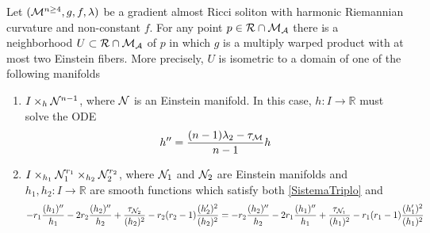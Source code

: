 \begin{teorema}\label{localstrucHarm}
	Let $(\mathcal{M}^{n \geq 4},g,f,\lambda)$ be a gradient almost Ricci soliton with harmonic Riemannian curvature and non-constant $f$. For any point $p\in\mathcal{R}\cap \mathcal{M}_{\mathcal{A}}$ there is a neighborhood $U\subset\mathcal{R}\cap \mathcal{M}_{\mathcal{A}}$ of $p$ in which $g$ is a multiply warped product with at most two Einstein fibers. More precisely, $U$ is isometric to a domain of one of the following manifolds
	\begin{enumerate}[label=\color{blue}\normalfont\textbf{(\theenumi)}]
		\item\label{simplesHarm} $I \times_{h} \mathcal{N}^{n-1}$, where $\mathcal{N}$ is an Einstein manifold. In this case, $h:I\to\mathbb{R}$ must solve the ODE
		\[
		h'' = \frac{ (n-1) \lambda_2 - \tau_{\mathcal{M}}}{n-1} h 
		\]
		\item\label{triploHarm} $I\times_{h_{1}} \mathcal{N}_{1}^{r_{1}}\times_{h_{2}} \mathcal{N}_{2}^{r_{2}}$, where $\mathcal{N}_1$ and $\mathcal{N}_2$ are Einstein manifolds and $h_{1},h_{2}:I\rightarrow\mathbb{R}$ are smooth functions which satisfy both \cref{SistemaTriplo} and
		\[
			-   r_1 \frac{ (h_1)''}{h_1} - 2 r_2 \frac{(h_2)''}{h_2}  +  \frac{\tau_{\mathcal{N}_2}}{(h_2)^2} - r_2 (r_2 - 1) \frac{(h_2')^2}{(h_2)^2} = -   r_2 \frac{(h_2)''}{h_2} - 2 r_1 \frac{(h_1)''}{h_1} + \frac{\tau_{\mathcal{N}_1} }{(h_1)^2} - r_1 (r_1 - 1) \frac{(h_1')^2}{(h_1)^2} 	
		\]
	\end{enumerate}
	 

\end{teorema}
